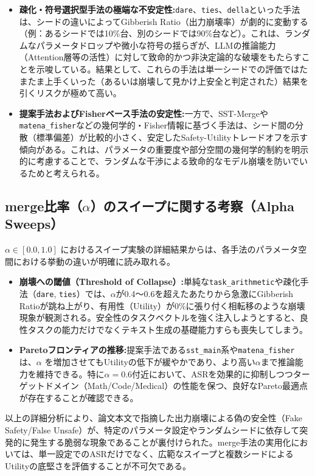 \begin{itemize}
    \item \textbf{疎化・符号選択型手法の極端な不安定性:}\texttt{dare}、\texttt{ties}、\texttt{della}といった手法は、シードの違いによってGibberish Ratio（出力崩壊率）が劇的に変動する（例：あるシードでは10\%台、別のシードでは90\%台など）。これは、ランダムなパラメータドロップや微小な符号の揺らぎが、LLMの推論能力（Attention層等の活性）に対して致命的かつ非決定論的な破壊をもたらすことを示唆している。結果として、これらの手法は単一シードでの評価ではたまたま上手くいった（あるいは崩壊して見かけ上安全と判定された）結果を引くリスクが極めて高い。
    \item \textbf{提案手法およびFisherベース手法の安定性:}一方で、SST-Mergeや\texttt{matena\_fisher}などの幾何学的・Fisher情報に基づく手法は、シード間の分散（標準偏差）が比較的小さく、安定したSafety-Utilityトレードオフを示す傾向がある。これは、パラメータの重要度や部分空間の幾何学的制約を明示的に考慮することで、ランダムな干渉による致命的なモデル崩壊を防いでいるためと考えられる。
\end{itemize}

\subsection{merge比率（$\alpha$）のスイープに関する考察（Alpha Sweeps）}
$\alpha \in [0.0, 1.0]$ におけるスイープ実験の詳細結果からは、各手法のパラメータ空間における挙動の違いが明確に読み取れる。

\begin{itemize}
    \item \textbf{崩壊への閾値（Threshold of Collapse）:}単純な\texttt{task\_arithmetic}や疎化手法（\texttt{dare}, \texttt{ties}）では、$\alpha$が0.4〜0.6を超えたあたりから急激にGibberish Ratioが跳ね上がり、有用性（Utility）が0\%に張り付く相転移のような崩壊現象が観測される。安全性のタスクベクトルを強く注入しようとすると、良性タスクの能力だけでなくテキスト生成の基礎能力すらも喪失してしまう。
    \item \textbf{Paretoフロンティアの推移:}提案手法である\texttt{sst\_main}系や\texttt{matena\_fisher}は、$\alpha$ を増加させてもUtilityの低下が緩やかであり、より高い$\alpha$まで推論能力を維持できる。特に$\alpha=0.6$付近において、ASRを効果的に抑制しつつターゲットドメイン（Math/Code/Medical）の性能を保つ、良好なPareto最適点が存在することが確認できる。
\end{itemize}

以上の詳細分析により、論文本文で指摘した出力崩壊による偽の安全性（Fake Safety/False Unsafe）が、特定のパラメータ設定やランダムシードに依存して突発的に発生する脆弱な現象であることが裏付けられた。merge手法の実用化においては、単一設定でのASRだけでなく、広範なスイープと複数シードによるUtilityの底堅さを評価することが不可欠である。

